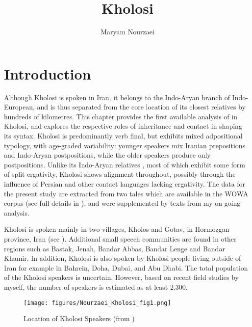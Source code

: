 \documentclass[output=paper,colorlinks,citecolor=brown]{langscibook}
\author{Maryam Nourzaei\affiliation{Uppsala University}}
\title{Kholosi}
\begin{document}
\maketitle\label{WOWA:ch:6}

\section{Introduction}\label{Kholosi:ss:1}

Although Kholosi is spoken in Iran, it belongs to the Indo-Aryan branch of Indo-European, and is thus separated from the core location of its closest relatives by hundreds of kilometres. This chapter provides the first available analysis of  in Kholosi, and explores the respective roles of inheritance and contact in shaping its syntax. Kholosi is predominantly verb final, but exhibits mixed adpositional typology, with age-graded variability: younger speakers mix Iranian prepositions and Indo-Aryan postpositions, while the older speakers produce only postpositions. Unlike its Indo-Aryan relatives \citep{dahl_ergativity_2016}, most of which exhibit some form of split ergativity, Kholosi shows  alignment throughout, possibly through the influence of Persian and other contact languages lacking ergativity. The data for the present study are extracted from two tales which are available in the WOWA corpus (see full details in \citealt{nourzaei_documentation_2022}), and were supplemented by texts from my on-going analysis.

Kholosi is spoken mainly in two villages, Kholos and Gotav, in Hormozgan province, Iran (see ). Additional small speech communities are found in other regions such as Bastak, Jenah, Bandar Abbas, Bandar Lenge and Bandar Khamir. In addition, Kholosi is also spoken by Kholosi people living outside of Iran for example in Bahrein, Doha, Dubai, and Abu Dhabi. The total population of the Kholosi speakers is uncertain. However, based on recent field studies by myself, the number of speakers is estimated as at least 2,300.

\begin{figure}
 \centering
 \texttt{[image: figures/Nourzaei\_Kholosi\_fig1.png]}
 \caption{Location of Kholosi Speakers (from \citealt{nourzaei_orality_2023})}
 \label{Kholosi:fig:1}
\end{figure}
\end{document}
